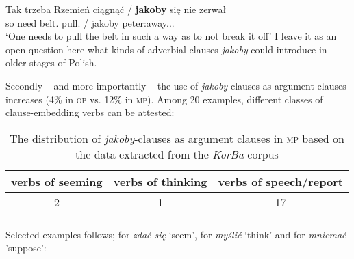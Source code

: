 \documentclass[output=paper
,modfonts
,nonflat]{langsci/langscibook}
\begin{document}
\ea \gll Tak trzeba Rzemień ciągnąć / \textbf{jakoby} się nie zerwał \\
		so need belt.{\acc} pull.{\infv} / jakoby {} {\negation} peter:away.{\lptcp}.{\sg}.{\masc} \\
\glt	`One needs to pull the belt in such a way as to not break it off'  	     
\z
I leave it as an open question here what kinds of adverbial clauses \emph{jakoby} could introduce in older stages of Polish. 

Secondly – and more importantly – the use of \emph{jakoby}-clauses as argument clauses increases (4\% in \textsc{op} vs. 12\% in \textsc{mp}). Among 20 examples, different classes of clause-embedding verbs can be attested: 

 \begin{table}[h]  \begin{tabular}{ccc} 
\lsptoprule
verbs of seeming & verbs of thinking & verbs of speech\slash report \\
\midrule
2 & 1 & 17  \\
 \lspbottomrule
\end{tabular}
\caption{The distribution of \emph{jakoby}-clauses as argument clauses in \textsc{mp} based on the data extracted from the \emph{KorBa} corpus}
\end{table}

\noindent Selected examples follows;  for \emph{zdać się} `seem',  for \emph{myślić} `think' and  for \emph{mniemać} 'suppose':     
\end{document}
